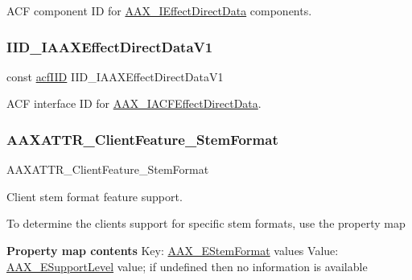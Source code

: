A\+CF component ID for \mbox{\hyperlink{a01817}{A\+A\+X\+\_\+\+I\+Effect\+Direct\+Data}} components. 

\mbox{\label{a00683_a656fd18bfe63b2578f8ea56f34616613}} 
\subsubsection{\texorpdfstring{IID\_IAAXEffectDirectDataV1}{IID\_IAAXEffectDirectDataV1}}
{\footnotesize\ttfamily const \mbox{\hyperlink{a00269_a59df0b41744eee7a066787aaedf97f67}{acf\+I\+ID}} I\+I\+D\+\_\+\+I\+A\+A\+X\+Effect\+Direct\+Data\+V1}



A\+CF interface ID for \mbox{\hyperlink{a01661}{A\+A\+X\+\_\+\+I\+A\+C\+F\+Effect\+Direct\+Data}}. 

\mbox{\label{a00683_a0a8849a8e49eca48475bb88a1da25d5d}} 
\subsubsection{\texorpdfstring{AAXATTR\_ClientFeature\_StemFormat}{AAXATTR\_ClientFeature\_StemFormat}}
{\footnotesize\ttfamily A\+A\+X\+A\+T\+T\+R\+\_\+\+Client\+Feature\+\_\+\+Stem\+Format}



Client stem format feature support. 

To determine the client\textquotesingle{}s support for specific stem formats, use the property map

{\bfseries{Property map contents}} Key\+: \mbox{\hyperlink{a00491_ad8af5ef008b2bd478add9a0acb0a1d85}{A\+A\+X\+\_\+\+E\+Stem\+Format}} values Value\+: \mbox{\hyperlink{a00491_aca7bf42860665d5da66f4ac342e761b3}{A\+A\+X\+\_\+\+E\+Support\+Level}} value; if undefined then no information is available \mbox{\label{a00683_aa6369eb43ac68152d30ec665de5ea603}} 
